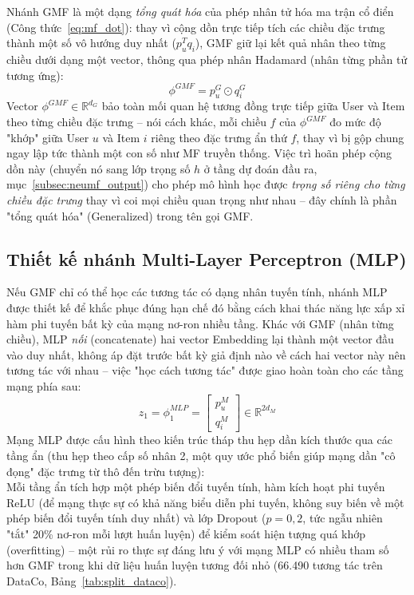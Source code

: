 Nhánh GMF là một dạng \emph{tổng quát hóa} của phép nhân tử hóa ma trận cổ điển (Công thức~\eqref{eq:mf_dot}): thay vì cộng dồn trực tiếp tích các chiều đặc trưng thành một số vô hướng duy nhất ($p_u^T q_i$), GMF giữ lại kết quả nhân theo từng chiều dưới dạng một vector, thông qua phép nhân Hadamard (nhân từng phần tử tương ứng):
\begin{equation}
    \phi^{GMF} = p_u^G \odot q_i^G
\end{equation}
Vector $\phi^{GMF} \in \mathbb{R}^{d_G}$ bảo toàn mối quan hệ tương đồng trực tiếp giữa User và Item theo từng chiều đặc trưng -- nói cách khác, mỗi chiều $f$ của $\phi^{GMF}$ đo mức độ "khớp" giữa User $u$ và Item $i$ riêng theo đặc trưng ẩn thứ $f$, thay vì bị gộp chung ngay lập tức thành một con số như MF truyền thống. Việc trì hoãn phép cộng dồn này (chuyển nó sang lớp trọng số $h$ ở tầng dự đoán đầu ra, mục~\ref{subsec:neumf_output}) cho phép mô hình học được \emph{trọng số riêng cho từng chiều đặc trưng} thay vì coi mọi chiều quan trọng như nhau -- đây chính là phần "tổng quát hóa" (Generalized) trong tên gọi GMF.

\subsection{Thiết kế nhánh Multi-Layer Perceptron (MLP)}
\label{subsec:mlp_design}

Nếu GMF chỉ có thể học các tương tác có dạng nhân tuyến tính, nhánh MLP được thiết kế để khắc phục đúng hạn chế đó bằng cách khai thác năng lực xấp xỉ hàm phi tuyến bất kỳ của mạng nơ-ron nhiều tầng. Khác với GMF (nhân từng chiều), MLP \emph{nối} (concatenate) hai vector Embedding lại thành một vector đầu vào duy nhất, không áp đặt trước bất kỳ giả định nào về cách hai vector này nên tương tác với nhau -- việc "học cách tương tác" được giao hoàn toàn cho các tầng mạng phía sau:
\begin{equation}
    z_1 = \phi_1^{MLP} = \begin{bmatrix} p_u^M \\ q_i^M \end{bmatrix} \in \mathbb{R}^{2 d_M}
\end{equation}
Mạng MLP được cấu hình theo kiến trúc tháp thu hẹp dần kích thước qua các tầng ẩn (thu hẹp theo cấp số nhân 2, một quy ước phổ biến giúp mạng dần "cô đọng" đặc trưng từ thô đến trừu tượng):
\begin{equation}
    [64 \longrightarrow 32 \longrightarrow 16 \longrightarrow 8]
\end{equation}
Mỗi tầng ẩn tích hợp một phép biến đổi tuyến tính, hàm kích hoạt phi tuyến ReLU (để mạng thực sự có khả năng biểu diễn phi tuyến, không suy biến về một phép biến đổi tuyến tính duy nhất) và lớp Dropout ($p = 0{,}2$, tức ngẫu nhiên "tắt" 20\% nơ-ron mỗi lượt huấn luyện) để kiểm soát hiện tượng quá khớp (overfitting) -- một rủi ro thực sự đáng lưu ý với mạng MLP có nhiều tham số hơn GMF trong khi dữ liệu huấn luyện tương đối nhỏ (66.490 tương tác trên DataCo, Bảng~\ref{tab:split_dataco}).

